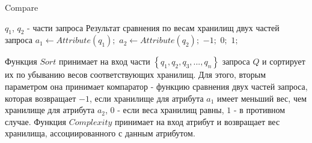 \documentclass{matmex-diploma}
\begin{document}
        \begin{algorithm}[H]                   
        \caption{Compare}              
        \label{cmp}                        
            \begin{algorithmic}        
                \REQUIRE $q_1$, $q_2$ - части запроса
                \ENSURE Результат сравнения по весам хранилищ двух частей запроса
                \STATE $a_1 \leftarrow Attribute(q_1);$
                \STATE $a_2 \leftarrow Attribute(q_2);$
                    \RETURN $-1;$
                \ELSE 
                        \RETURN $0;$
                    \ELSE
                        \RETURN $1;$
                    \ENDIF
                \ENDIF
            \end{algorithmic}
        \end{algorithm}
        
        Функция $Sort$ принимает на вход части $\left\{ q_1, q_2, q_3, ... , q_n \right\}$ запроса $Q$ и сортирует их по убыванию весов соответствующих хранилищ. Для этого, вторым параметром она принимает компаратор - функцию сравнения двух частей запроса, которая возвращает $-1$, если хранилище для атрибута $a_1$ имеет меньший вес, чем хранилище для атрибута $a_2$, $0$ - если веса хранилищ равны, $1$ - в противном случае. Функция $Complexity$ принимает на вход атрибут и возвращает вес хранилища, ассоциированного с данным атрибутом.
        
\end{document}
